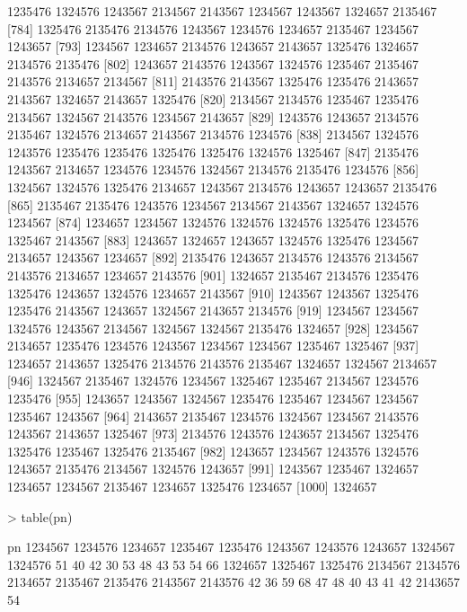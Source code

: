 \documentclass{scrartcl}
\begin{document}
\begin{Schunk}
\begin{Soutput}
 [775] 1235476 1324576 1243567 2134567 2143567 1234567 1243567 1324657 2135467
 [784] 1325476 2135476 2134576 1243567 1234576 1234657 2135467 1234567 1243657
 [793] 1234567 1234657 2134576 1243657 2143657 1325476 1324657 2134576 2135476
 [802] 1243657 2143576 1243567 1324576 1235467 2135467 2143576 2134657 2134567
 [811] 2143576 2143567 1325476 1235476 2143657 2143567 1324657 2143657 1325476
 [820] 2134567 2134576 1235467 1235476 2134567 1324567 2143576 1234567 2143657
 [829] 1243576 1243657 2134576 2135467 1324576 2134657 2143567 2134576 1234576
 [838] 2134567 1324576 1243576 1235476 1235476 1325476 1325476 1324576 1325467
 [847] 2135476 1243567 2134657 1234576 1234576 1324567 2134576 2135476 1234576
 [856] 1324567 1324576 1325476 2134657 1243567 2134576 1243657 1243657 2135476
 [865] 2135467 2135476 1243576 1234567 2134567 2143567 1324657 1324576 1234567
 [874] 1234657 1234567 1324576 1324576 1324576 1325476 1234576 1325467 2143567
 [883] 1243657 1324657 1243657 1324576 1325476 1234567 2134657 1243567 1234657
 [892] 2135476 1243657 2134576 1243576 2134567 2143576 2134657 1234657 2143576
 [901] 1324657 2135467 2134576 1235476 1325476 1243657 1324576 1234657 2143567
 [910] 1243567 1243567 1325476 1235476 2143567 1243657 1324567 2143657 2134576
 [919] 1234567 1234567 1324576 1243567 2134567 1324567 1324567 2135476 1324657
 [928] 1234567 2134657 1235476 1234576 1243567 1234567 1234567 1235467 1325467
 [937] 1234657 2143657 1325476 2134576 2143576 2135467 1324657 1324567 2134657
 [946] 1324567 2135467 1324576 1234567 1325467 1235467 2134567 1234576 1235476
 [955] 1243657 1243567 1324567 1235476 1235467 1234567 1234567 1235467 1243567
 [964] 2143657 2135467 1234576 1324567 1234567 2143576 1243567 2143657 1325467
 [973] 2134576 1243576 1243657 2134567 1325476 1325476 1235467 1325476 2135467
 [982] 1243657 1234567 1243576 1324576 1243657 2135476 2134567 1324576 1243657
 [991] 1243567 1235467 1324657 1234657 1234567 2135467 1234657 1325476 1234657
[1000] 1324657
\end{Soutput}
\begin{Sinput}
> table(pn)
\end{Sinput}
\begin{Soutput}
pn
1234567 1234576 1234657 1235467 1235476 1243567 1243576 1243657 1324567 1324576 
     51      40      42      30      53      48      43      53      54      66 
1324657 1325467 1325476 2134567 2134576 2134657 2135467 2135476 2143567 2143576 
     42      36      59      68      47      48      40      43      41      42 
2143657 
     54 
\end{Soutput}
\end{Schunk}
\end{document}
